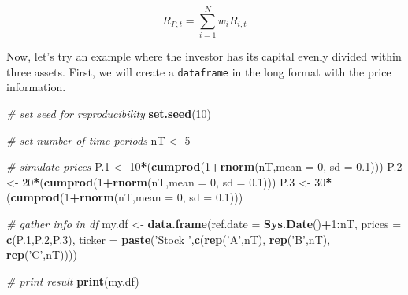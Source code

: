 \documentclass[11pt,]{book}
\newenvironment{Shaded}{\begin{snugshade}}{\end{snugshade}}
\newcommand{\KeywordTok}[1]{\textcolor[rgb]{0.27,0.27,0.27}{\textbf{#1}}}
\newcommand{\DataTypeTok}[1]{\textcolor[rgb]{0.27,0.27,0.27}{#1}}
\newcommand{\DecValTok}[1]{\textcolor[rgb]{0.06,0.06,0.06}{#1}}
\newcommand{\FloatTok}[1]{\textcolor[rgb]{0.06,0.06,0.06}{#1}}
\newcommand{\StringTok}[1]{\textcolor[rgb]{0.5,0.5,0.5}{#1}}
\newcommand{\CommentTok}[1]{\textcolor[rgb]{0.56,0.35,0.01}{\textit{#1}}}
\newcommand{\OperatorTok}[1]{\textcolor[rgb]{0.81,0.36,0.00}{\textbf{#1}}}
\newcommand{\NormalTok}[1]{#1}
\begin{document}
\[ R_{P,t} = \sum_{i=1}^{N} w_i R_{i,t} \]

Now, let's try an example where the investor has its capital evenly
divided within three assets. First, we will create a \texttt{dataframe}
in the long format with the price information.

\begin{Shaded}
\begin{Highlighting}[]
\CommentTok{# set seed for reproducibility}
\KeywordTok{set.seed}\NormalTok{(}\DecValTok{10}\NormalTok{)}

\CommentTok{# set number of time periods}
\NormalTok{nT <-}\StringTok{ }\DecValTok{5}

\CommentTok{# simulate prices}
\NormalTok{P.}\DecValTok{1}\NormalTok{ <-}\StringTok{ }\DecValTok{10}\OperatorTok{*}\NormalTok{(}\KeywordTok{cumprod}\NormalTok{(}\DecValTok{1}\OperatorTok{+}\KeywordTok{rnorm}\NormalTok{(nT,}\DataTypeTok{mean =} \DecValTok{0}\NormalTok{, }\DataTypeTok{sd =} \FloatTok{0.1}\NormalTok{)))}
\NormalTok{P.}\DecValTok{2}\NormalTok{ <-}\StringTok{ }\DecValTok{20}\OperatorTok{*}\NormalTok{(}\KeywordTok{cumprod}\NormalTok{(}\DecValTok{1}\OperatorTok{+}\KeywordTok{rnorm}\NormalTok{(nT,}\DataTypeTok{mean =} \DecValTok{0}\NormalTok{, }\DataTypeTok{sd =} \FloatTok{0.1}\NormalTok{)))}
\NormalTok{P.}\DecValTok{3}\NormalTok{ <-}\StringTok{ }\DecValTok{30}\OperatorTok{*}\NormalTok{(}\KeywordTok{cumprod}\NormalTok{(}\DecValTok{1}\OperatorTok{+}\KeywordTok{rnorm}\NormalTok{(nT,}\DataTypeTok{mean =} \DecValTok{0}\NormalTok{, }\DataTypeTok{sd =} \FloatTok{0.1}\NormalTok{)))}

\CommentTok{# gather info in df}
\NormalTok{my.df <-}\StringTok{ }\KeywordTok{data.frame}\NormalTok{(}\DataTypeTok{ref.date =} \KeywordTok{Sys.Date}\NormalTok{()}\OperatorTok{+}\DecValTok{1}\OperatorTok{:}\NormalTok{nT,}
                    \DataTypeTok{prices =} \KeywordTok{c}\NormalTok{(P.}\DecValTok{1}\NormalTok{,P.}\DecValTok{2}\NormalTok{,P.}\DecValTok{3}\NormalTok{),}
                    \DataTypeTok{ticker =} \KeywordTok{paste}\NormalTok{(}\StringTok{'Stock '}\NormalTok{,}\KeywordTok{c}\NormalTok{(}\KeywordTok{rep}\NormalTok{(}\StringTok{'A'}\NormalTok{,nT),}
                                              \KeywordTok{rep}\NormalTok{(}\StringTok{'B'}\NormalTok{,nT),}
                                              \KeywordTok{rep}\NormalTok{(}\StringTok{'C'}\NormalTok{,nT))))}

\CommentTok{# print result  }
\KeywordTok{print}\NormalTok{(my.df)}
\end{Highlighting}
\end{Shaded}
\end{document}
